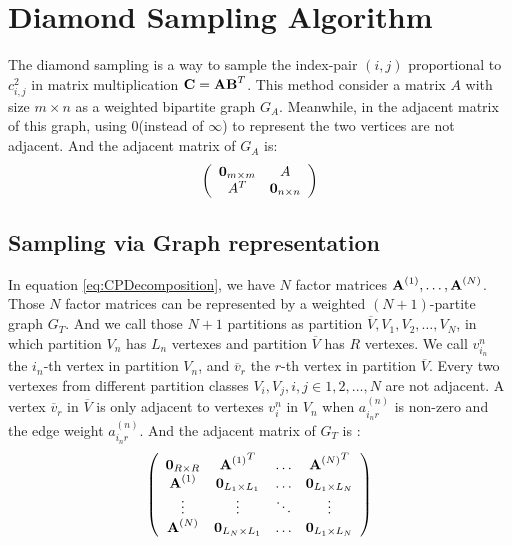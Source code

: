 \documentclass[letterpaper]{article}
\newcommand{\Sca}[3]{{#1}^{(#2)}_{i_#2#3}}%
\newcommand{\V}[1]{{\bm{{\MakeLowercase{#1}}}}}
\newcommand{\M}[1]{{\bm{\mathbf{\MakeUppercase{#1}}}}}
\newcommand{\Mn}[2]{\M{#1}^{(#2)}}
\begin{document}
\section{Diamond Sampling Algorithm}

The diamond sampling is a way to sample the index-pair $(i,j)$ proportional to $c^2_{i,j}$ in matrix multiplication $\M{C} = \M{A}\M{B}^T$. This method consider a matrix $A$ with size $m\times n$ as a weighted bipartite graph $G_{A}$. Meanwhile, in the adjacent matrix of this graph, using $0$(instead of $\infty$) to represent the two vertices are not adjacent. And the adjacent matrix of $G_{A}$ is:
\[
\left(
  \begin{array}{cc}
    \V{0}_{m\times m} & A \\
    A^T & \V{0}_{n\times n} \\
  \end{array}
\right)
\]

\subsection{Sampling via Graph representation}

In equation \ref{eq:CPDecomposition}, we have $N$ factor matrices $\Mn{A}{1},\dots,\Mn{A}{N}$.
Those $N$ factor matrices can be represented by a weighted $(N+1)$-partite graph $G_{T}$. And we call those $N+1$ partitions as partition $\overline{V},V_{1},V_{2},\ldots,V_{N}$, in which partition $V_{n}$ has $L_n$ vertexes and partition $\overline{V}$ has $R$ vertexes. We call $v^n_{i_n}$ the $i_n$-th vertex in partition $V_{n}$, and $\overline{v}_{r}$ the $r$-th vertex in partition $\overline{V}$. Every two vertexes from different partition classes $V_i,V_j,i,j\in {1,2,\ldots,N}$ are not adjacent. A vertex $\overline{v}_r$ in $\overline{V}$ is only adjacent to vertexes $v^n_i$ in $V_n$ when $\Sca{a}{n}{r}$ is non-zero and the edge weight $\Sca{a}{n}{r}$. And the adjacent matrix of $G_{T}$ is :
\[
\left(
  \begin{array}{cccc}
    \M{0}_{R\times R}   & {\Mn{A}{1}}^T         & \ldots & {\Mn{A}{N}}^T \\
    \Mn{A}{1}           & \M{0}_{L_1\times L_1} & \ldots & \M{0}_{L_1\times L_N} \\
    \vdots              & \vdots                & \ddots & \vdots \\
    \Mn{A}{N}           & \M{0}_{L_N\times L_1} & \ldots & \M{0}_{L_1\times L_N} \\
  \end{array}
\right)
\]
\end{document}
